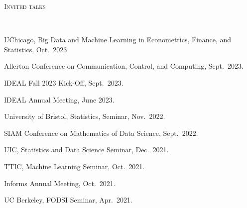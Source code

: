 \documentclass[a4paper, 10pt]{article}
\newenvironment{changemargin}[2]{%
  \begin{list}{}{%
    \setlength{\topsep}{0pt}%
    \setlength{\leftmargin}{#1}%
    \setlength{\rightmargin}{#2}%
    \setlength{\listparindent}{\parindent}%
    \setlength{\itemindent}{\parindent}%
    \setlength{\parsep}{\parskip}%
  }%
  \item[]}{\end{list}
}
\newcommand{\lineover}{
	\begin{changemargin}{-0.05in}{-0.05in}
		\vspace*{-8pt}
		\hrulefill \\
		\vspace*{-2pt}
	\end{changemargin}
}
\newcommand{\header}[1]{
	\begin{changemargin}{-0.5in}{-0.5in}
		\scshape{#1}\\
  	\lineover
	\end{changemargin}
}
\newenvironment{body} {
	\vspace*{-16pt}
	\begin{changemargin}{-0.3in}{-0.5in}
  }	
	{\end{changemargin}
}
\begin{document}
\bigskip
\header{\LARGE{Invited talks}}
\begin{body}
	\vspace{18pt}
	\begin{enumerate}[label={[{T}{{\arabic*}}]}]
	
	\item UChicago, Big Data and Machine Learning in Econometrics, Finance, and Statistics, Oct.~2023
	\item Allerton Conference on Communication, Control, and Computing, Sept.~2023.
	
	\item IDEAL Fall 2023 Kick-Off, Sept.~2023.
	
	\item IDEAL Annual Meeting, June 2023.
	\item University of Bristol, Statistics, Seminar, Nov.~2022. 
	
	\item SIAM Conference on Mathematics of Data Science, Sept.~2022.
	
	\item UIC, Statistics and Data Science Seminar, Dec.~2021. 
	
	
	\item TTIC, Machine Learning Seminar, Oct.~2021.
	
	\item Informs Annual Meeting, Oct.~2021.
	
	\item UC Berkeley, FODSI Seminar, Apr.~2021. 
	

\end{enumerate}
\end{body}
\end{document}
